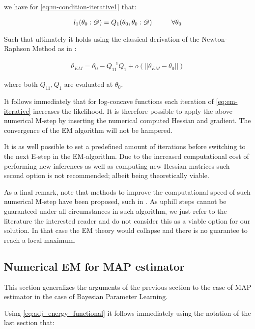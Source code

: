 \documentclass[11pt]{article}
\begin{document}
\begin{article}
we have for \ref{eq:m-condition-iterative1} that:

\begin{align} 
 l_1(\theta_0: \mathscr{D})  = Q_1(\theta_0, \theta_0: \mathscr{D}) \hspace*{1cm} \forall \theta_0 \label{eq:m-condition-entropy-iterative2} 
\end{align}

Such that ultimately it holds using the classical derivation of the
Newton-Raphson Method as in \cite{storvik2007numerical}:


\begin{align} 
 \theta_{EM}  = \theta_{0} - Q_{11}^{-1} Q_1 + o(||\theta_{EM} - \theta_{0}||) \label{eq:em-iterative}
\end{align}

where both \(Q_{11}, Q_{1}\) are evaluated at \(\theta_0\).

It follows immediately that for log-concave functions each
iteration of \ref{eq:em-iterative} increases the likelihood. It is
therefore possible to apply the above numerical M-step by inserting
the numerical computed Hessian and gradient. The convergence of the
EM algorithm will not be hampered.

It is as well possible to set a predefined amount of iterations
before switching to the next E-step in the EM-algorithm. Due to the
increased computational cost of performing new inferences as well
as computing new Hessian matrices such second option is not
recommended; albeit being theoretically viable.

As a final remark, note that methods to improve the computational
speed of such numerical M-step have been proposed, such in
\cite{Louis_1982}. As uphill steps cannot be guaranteed under all
circumstances in such algorithm, we just refer to the literature
the interested reader and do not consider this as a viable option
for our solution. In that case the EM theory would collapse and
there is no guarantee to reach a local maximum.

\subsection{Numerical EM for MAP estimator}
\label{sec:orgbcfb7ac}

This section generalizes the arguments of the previous section to
the case of MAP estimator in the case of Bayesian Parameter
Learning.

Using \ref{eq:adj_energy_functional} it follows immediately using the
notation of the last section that:


\end{article}
\end{document}
